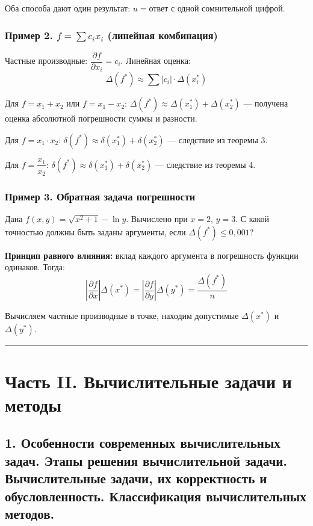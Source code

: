 \documentclass[14pt,a4paper]{extarticle}
\begin{document}
Оба способа дают один результат: $u = \text{ответ с одной сомнительной цифрой}$.

\subsubsection{Пример 2. $f = \sum c_i x_i$ (линейная комбинация)}

Частные производные: $\dfrac{\partial f}{\partial x_i} = c_i$. Линейная оценка:
\[\Delta(f^*) \approx \sum |c_i| \cdot \Delta(x_i^*)\]

Для $f = x_1 + x_2$ или $f = x_1 - x_2$: $\Delta(f^*) \approx \Delta(x_1^*) + \Delta(x_2^*)$ --- получена оценка абсолютной погрешности суммы и разности.

Для $f = x_1 \cdot x_2$: $\delta(f^*) \approx \delta(x_1^*) + \delta(x_2^*)$ --- следствие из теоремы 3.

Для $f = \dfrac{x_1}{x_2}$: $\delta(f^*) \approx \delta(x_1^*) + \delta(x_2^*)$ --- следствие из теоремы 4.

\subsubsection{Пример 3. Обратная задача погрешности}

Дана $f(x, y) = \sqrt{x^2 + 1} - \ln y$. Вычислено при $x = 2$, $y = 3$. С какой точностью должны быть заданы аргументы, если $\Delta(f^*) \leq 0{,}001$?

\textbf{Принцип равного влияния:} вклад каждого аргумента в погрешность функции одинаков. Тогда:
\[\left|\frac{\partial f}{\partial x}\right| \Delta(x^*) = \left|\frac{\partial f}{\partial y}\right| \Delta(y^*) = \frac{\Delta(f^*)}{n}\]

Вычисляем частные производные в точке, находим допустимые $\Delta(x^*)$ и $\Delta(y^*)$.

\hrule\bigskip

\section{Часть II. Вычислительные задачи и методы}

\subsection{1. Особенности современных вычислительных задач. Этапы решения вычислительной задачи. Вычислительные задачи, их корректность и обусловленность. Классификация вычислительных методов.}
\end{document}
